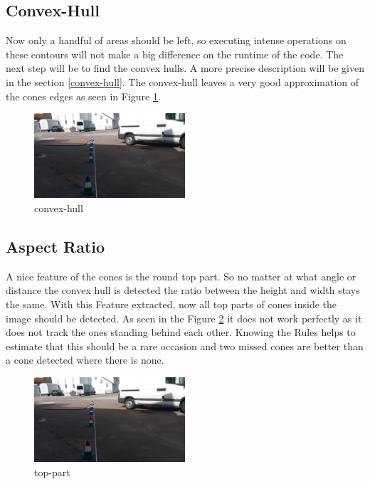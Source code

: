 \documentclass[10pt,a4paper]{article}
\begin{document}
	\subsection{Convex-Hull}
	Now only a handful of areas should be left, so executing intense operations on these contours will not make a big difference on the runtime of the code.
	The next step will be to find the convex hulls. A more precise description will be given in the section \ref{convex-hull}. The convex-hull leaves a very good approximation of the cones edges as seen in Figure \ref{convex-hull-picture}.
	\begin{figure}[h]
		\centering
		\includegraphics[width=0.5\textwidth]{Abb/convex-hull.png}
		\caption{convex-hull}
		\label{convex-hull-picture}
	\end{figure}
	
	\subsection{Aspect Ratio}
	A nice feature of the cones is the round top part. So no matter at what angle or distance the convex hull is detected the ratio between the height and width stays the same. With this Feature extracted, now all top parts of cones inside the image should be detected. As seen in the Figure \ref{top-part} it does not work perfectly as it does not track the ones standing behind each other. Knowing the Rules helps to estimate that this should be a rare occasion and two missed cones are better than a cone detected where there is none.
	\begin{figure}[h]
		\centering
		\includegraphics[width=0.5\textwidth]{Abb/top_part_cone.png}
		\caption{top-part}
		\label{top-part}
	\end{figure}
	
\end{document}
